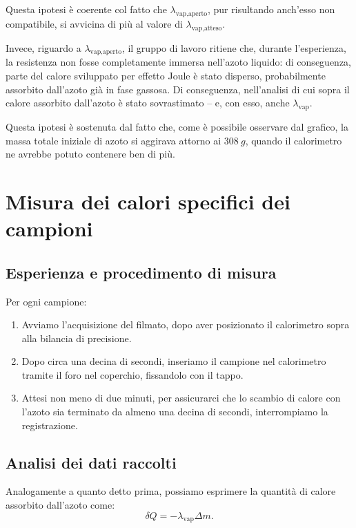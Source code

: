 \documentclass{article}
\begin{document}
Questa ipotesi è coerente col fatto che $\lambda_\text{vap,aperto}$,
pur risultando anch'esso non compatibile, si avvicina di più al valore
di $\lambda_\text{vap,atteso}$.

\vspace{2mm}
Invece, riguardo a $\lambda_\text{vap,aperto}$, il gruppo di
lavoro ritiene che, durante l'esperienza, la resistenza non fosse
completamente immersa nell'azoto liquido: di conseguenza, parte
del calore sviluppato per effetto Joule è stato disperso,
probabilmente assorbito dall'azoto già in fase gassosa.
Di conseguenza, nell'analisi di cui sopra il calore assorbito
dall'azoto è stato sovrastimato – e, con esso, anche
$\lambda_\text{vap}$.

Questa ipotesi è sostenuta dal fatto che, come è possibile
osservare dal grafico, la massa totale iniziale di azoto si
aggirava attorno ai $\qty{308}{g}$, quando il calorimetro ne
avrebbe potuto contenere ben di più.

\section{Misura dei calori specifici dei campioni}

\subsection{Esperienza e procedimento di misura}

Per ogni campione:
\begin{enumerate}
  \item
    Avviamo l'acquisizione del filmato, dopo aver posizionato il calorimetro
    sopra alla bilancia di precisione.
  \item
    Dopo circa una decina di secondi, inseriamo il campione nel calorimetro
    tramite il foro nel coperchio, fissandolo con il tappo.
  \item
    Attesi non meno di due minuti, per assicurarci che lo scambio di calore con
    l'azoto sia terminato da almeno una decina di secondi, interrompiamo
    la registrazione.
\end{enumerate}

\subsection{Analisi dei dati raccolti}
Analogamente a quanto detto prima, possiamo esprimere la quantità di calore
assorbito dall'azoto come:
\[
  \delta Q = - \lambda_\text{vap} \Delta m.
\]
\end{document}
